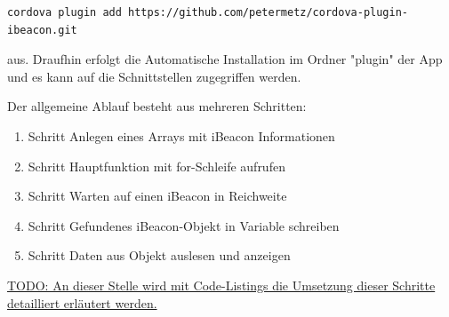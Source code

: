 \begin{lstlisting}
cordova plugin add https://github.com/petermetz/cordova-plugin-ibeacon.git
\end{lstlisting} 


aus. Draufhin erfolgt die Automatische Installation im Ordner "plugin" der App und es kann auf die Schnittstellen zugegriffen werden.

Der allgemeine Ablauf besteht aus mehreren Schritten:
\begin{enumerate}
\item Schritt Anlegen eines Arrays mit iBeacon Informationen
\item Schritt Hauptfunktion mit for-Schleife aufrufen
\item Schritt Warten auf einen iBeacon in Reichweite
\item Schritt Gefundenes iBeacon-Objekt in Variable schreiben
\item Schritt Daten aus Objekt auslesen und anzeigen
\end{enumerate}



\underline{TODO: An dieser Stelle wird mit Code-Listings die Umsetzung dieser Schritte }\\
\underline{detailliert erläutert werden.}
